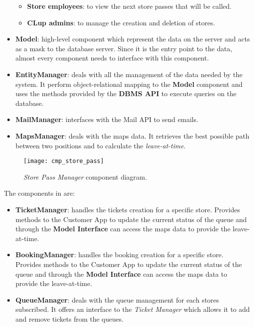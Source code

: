 \begin{itemize}
\begin{itemize}
		\item \textbf{Store employees}: to view the next store passes that will be called.
		\item \textbf{CLup admins}: to manage the creation and deletion of stores.
	\end{itemize}
	
	\item \textbf{Model}: high-level component which represent the data on the server and acts as a mask to the database server. Since it is the entry point to the data, almost every component needs to interface with this component.
	
	\item \textbf{EntityManager}: deals with all the management of the data needed by the system. It perform object-relational mapping to the \textbf{Model} component and uses the methods provided by the \textbf{DBMS API} to execute queries on the database.
	
	\item \textbf{MailManager}: interfaces with the Mail API to send emails.	
	
	\item \textbf{MapsManager}: deals with the maps data. It retrieves the best possible path between two positions and to calculate the \textit{leave-at-time}.
\end{itemize}

\begin{figure}[H]
	\centering
	\texttt{[image: cmp\_store\_pass]}
	\caption{\textit{Store Pass Manager} component diagram.}
	\label{fig:cmp_store_pass}
\end{figure}

The components in  are:
\begin{itemize}
	\item \textbf{TicketManager}: handles the tickets creation for a specific store. Provides methods to the Customer App to update the current status of the queue and through the \textbf{Model Interface} can access the maps data to provide the leave-at-time.
	
	\item \textbf{BookingManager}: handles the booking creation for a specific store. Provides methods to the Customer App to update the current status of the queue and through the \textbf{Model Interface} can access the maps data to provide the leave-at-time.
	
	\item \textbf{QueueManager}: deals with the queue management for each stores subscribed. It offers an interface to the \textit{Ticket Manager} which allows it to add and remove tickets from the queues.
\end{itemize}

